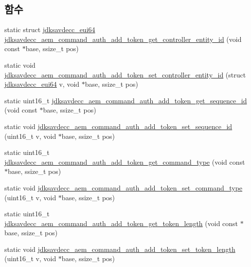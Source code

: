 \subsection*{함수}
\begin{DoxyCompactItemize}
\item 
static struct \hyperlink{structjdksavdecc__eui64}{jdksavdecc\+\_\+eui64} \hyperlink{group__command__auth__add__token_gadc5f9a5ce876a8fb2969c787ee7b2645}{jdksavdecc\+\_\+aem\+\_\+command\+\_\+auth\+\_\+add\+\_\+token\+\_\+get\+\_\+controller\+\_\+entity\+\_\+id} (void const $\ast$base, ssize\+\_\+t pos)
\item 
static void \hyperlink{group__command__auth__add__token_ga7bbc828f4a5f93681eda097225299f42}{jdksavdecc\+\_\+aem\+\_\+command\+\_\+auth\+\_\+add\+\_\+token\+\_\+set\+\_\+controller\+\_\+entity\+\_\+id} (struct \hyperlink{structjdksavdecc__eui64}{jdksavdecc\+\_\+eui64} v, void $\ast$base, ssize\+\_\+t pos)
\item 
static uint16\+\_\+t \hyperlink{group__command__auth__add__token_gaa70237d4490d2f8b89aee0a6b2d1bfa6}{jdksavdecc\+\_\+aem\+\_\+command\+\_\+auth\+\_\+add\+\_\+token\+\_\+get\+\_\+sequence\+\_\+id} (void const $\ast$base, ssize\+\_\+t pos)
\item 
static void \hyperlink{group__command__auth__add__token_gaae065c785edb24230f9a4628d07139f2}{jdksavdecc\+\_\+aem\+\_\+command\+\_\+auth\+\_\+add\+\_\+token\+\_\+set\+\_\+sequence\+\_\+id} (uint16\+\_\+t v, void $\ast$base, ssize\+\_\+t pos)
\item 
static uint16\+\_\+t \hyperlink{group__command__auth__add__token_gad3a33687c21040d3615081a056284854}{jdksavdecc\+\_\+aem\+\_\+command\+\_\+auth\+\_\+add\+\_\+token\+\_\+get\+\_\+command\+\_\+type} (void const $\ast$base, ssize\+\_\+t pos)
\item 
static void \hyperlink{group__command__auth__add__token_ga8f6807199a4f70b689ab7cf1fedb4b43}{jdksavdecc\+\_\+aem\+\_\+command\+\_\+auth\+\_\+add\+\_\+token\+\_\+set\+\_\+command\+\_\+type} (uint16\+\_\+t v, void $\ast$base, ssize\+\_\+t pos)
\item 
static uint16\+\_\+t \hyperlink{group__command__auth__add__token_ga0b29b7219d1586729f6dffec07fea614}{jdksavdecc\+\_\+aem\+\_\+command\+\_\+auth\+\_\+add\+\_\+token\+\_\+get\+\_\+token\+\_\+length} (void const $\ast$base, ssize\+\_\+t pos)
\item 
static void \hyperlink{group__command__auth__add__token_ga981629b56b5f28bf06395231ef9a482c}{jdksavdecc\+\_\+aem\+\_\+command\+\_\+auth\+\_\+add\+\_\+token\+\_\+set\+\_\+token\+\_\+length} (uint16\+\_\+t v, void $\ast$base, ssize\+\_\+t pos)

\end{DoxyCompactItemize}
